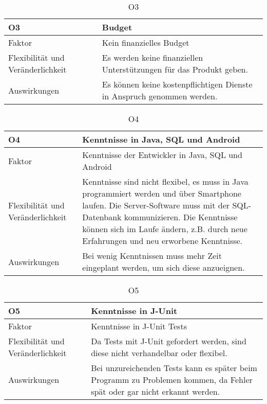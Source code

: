 \begin{table}[H]
\caption{O3}
\begin{tabular}{|p{3cm}|p{12cm}|}\hline
\textbf{O3} & \textbf{Budget} \\ \hline \hline
Faktor & Kein finanzielles Budget\\ \hline
Flexibilität und Veränderlichkeit & Es werden keine finanziellen Unterstützungen für das Produkt geben. \\ \hline
Auswirkungen & Es können keine kostenpflichtigen Dienste in Anspruch genommen werden.\\ \hline
\end{tabular}
\end{table}

\begin{table}[H]
\caption{O4}
\begin{tabular}{|p{3cm}|p{12cm}|}\hline
\textbf{O4} & \textbf{Kenntnisse in Java, SQL und Android} \\ \hline \hline
Faktor & Kenntnisse der Entwickler in Java, SQL und Android\\ \hline
Flexibilität und Veränderlichkeit & Kenntnisse sind nicht flexibel, es muss in Java programmiert werden und über Smartphone laufen. Die Server-Software muss mit der SQL-Datenbank kommunizieren. Die Kenntnisse können sich im Laufe ändern, z.B. durch neue Erfahrungen und neu erworbene Kenntnisse.\\ \hline
Auswirkungen & Bei wenig Kenntnissen muss mehr Zeit eingeplant werden, um sich diese anzueignen.\\ \hline
\end{tabular}
\end{table}

\begin{table}[H]
\caption{O5}
\begin{tabular}{|p{3cm}|p{12cm}|}\hline
\textbf{O5} & \textbf{Kenntnisse in J-Unit} \\ \hline \hline
Faktor & Kenntnisse in J-Unit Tests\\ \hline
Flexibilität und Veränderlichkeit & Da Tests mit J-Unit gefordert werden, sind diese nicht verhandelbar oder flexibel.\\ \hline
Auswirkungen & Bei unzureichenden Tests kann es später beim Programm zu Problemen kommen, da Fehler spät oder gar nicht erkannt werden.\\ \hline
\end{tabular}
\end{table}

